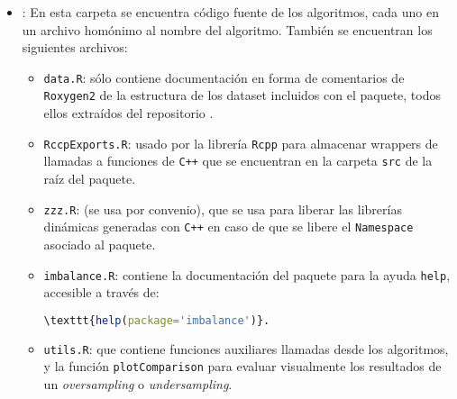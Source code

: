 \begin{itemize}
 \item \R: En esta carpeta se encuentra código fuente de los algoritmos, cada uno en un archivo homónimo al
 nombre del algoritmo. También se encuentran los siguientes archivos:
 
 \begin{itemize}
  \item \texttt{data.R}: sólo contiene documentación en forma de comentarios de \texttt{Roxygen2} de la estructura
    de los dataset incluidos con el paquete, todos ellos extraídos del repositorio .
  \item \texttt{RccpExports.R}: usado por la librería \texttt{Rcpp} para almacenar wrappers de llamadas a funciones
    de \texttt{C++} que se encuentran en la carpeta \texttt{src} de la raíz del paquete.
  \item \texttt{zzz.R}: (se usa por convenio), que se usa para liberar las librerías dinámicas generadas con 
    \texttt{C++} en caso de que se libere el \texttt{Namespace} asociado al paquete.
  \item \texttt{imbalance.R}: contiene la documentación del paquete para la ayuda \texttt{help}, accesible a través de:
    \begin{lstlisting}[language=R, numbers=none]
    \texttt{help(package='imbalance')}.
    \end{lstlisting}
  \item \texttt{utils.R}: que contiene funciones auxiliares llamadas desde los algoritmos, y la función \texttt{plotComparison}
    para evaluar visualmente los resultados de un \textit{oversampling} o \textit{undersampling}.
 \end{itemize}
 

\end{itemize}
